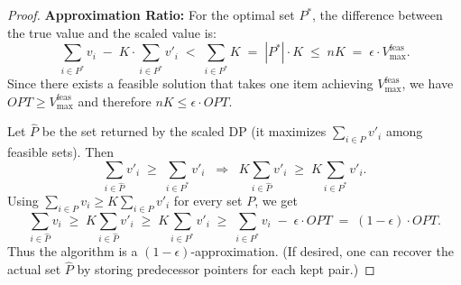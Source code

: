 \begin{proof}
    \textbf{Approximation Ratio:} For the optimal set $P^*$, the difference between the true value and the scaled value is:
    \[
    \sum_{i \in P^*} v_i \;-\; K \cdot \sum_{i \in P^*} v'_i
    \;<\;
    \sum_{i \in P^*} K
    \;=\;
    |P^*|\cdot K
    \;\le\;
    nK
    \;=\;
    \epsilon\cdot V_{\max}^{\text{feas}}.
    \]
    Since there exists a feasible solution that takes one item achieving $V_{\max}^{\text{feas}}$, we have $OPT\ge V_{\max}^{\text{feas}}$ and therefore $nK\le \epsilon\cdot OPT$.

    Let $\widehat{P}$ be the set returned by the scaled DP (it maximizes $\sum_{i\in P} v'_i$ among feasible sets). Then
    \[
    \sum_{i\in \widehat{P}} v'_i \;\ge\; \sum_{i\in P^*} v'_i
    \;\;\Longrightarrow\;\;
    K\sum_{i\in \widehat{P}} v'_i \;\ge\; K\sum_{i\in P^*} v'_i.
    \]
    Using $\sum_{i\in P} v_i \ge K\sum_{i\in P} v'_i$ for every set $P$, we get
    \[
    \sum_{i\in \widehat{P}} v_i
    \;\ge\;
    K\sum_{i\in \widehat{P}} v'_i
    \;\ge\;
    K\sum_{i\in P^*} v'_i
    \;\ge\;
    \sum_{i\in P^*} v_i \;-\; \epsilon\cdot OPT
    \;=\;
    (1-\epsilon)\cdot OPT.
    \]
    Thus the algorithm is a $(1-\epsilon)$-approximation. (If desired, one can recover the actual set $\widehat{P}$ by storing predecessor pointers for each kept pair.)
\end{proof}
